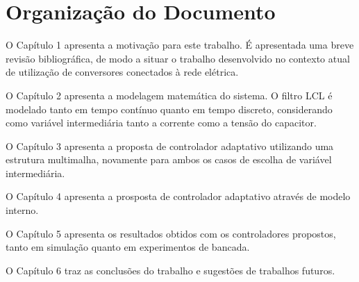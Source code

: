 \section{Organização do Documento}

	O Capítulo 1 apresenta a motivação para este trabalho. É apresentada uma breve revisão bibliográfica, de modo a situar o trabalho desenvolvido no contexto atual de utilização de conversores conectados à rede elétrica.

	O Capítulo 2 apresenta a modelagem matemática do sistema. O filtro LCL é modelado tanto em tempo contínuo quanto em tempo discreto, considerando como variável intermediária tanto a corrente como a tensão do capacitor.

	O Capítulo 3 apresenta a proposta de controlador adaptativo utilizando uma estrutura multimalha, novamente para ambos os casos de escolha de variável intermediária.

	O Capítulo 4 apresenta a prosposta de controlador adaptativo através de modelo interno.

	O Capítulo 5 apresenta os resultados obtidos com os controladores propostos, tanto em simulação quanto em experimentos de bancada.

	O Capítulo 6 traz as conclusões do trabalho e sugestões de trabalhos futuros.

